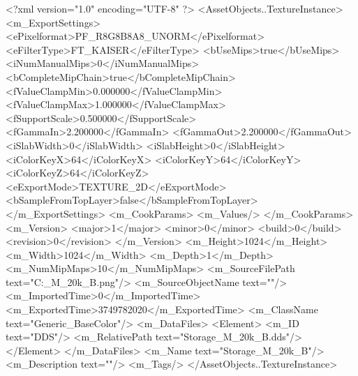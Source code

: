 <?xml version="1.0" encoding="UTF-8" ?>
<AssetObjects..TextureInstance>
	<m_ExportSettings>
		<ePixelformat>PF_R8G8B8A8_UNORM</ePixelformat>
		<eFilterType>FT_KAISER</eFilterType>
		<bUseMips>true</bUseMips>
		<iNumManualMips>0</iNumManualMips>
		<bCompleteMipChain>true</bCompleteMipChain>
		<fValueClampMin>0.000000</fValueClampMin>
		<fValueClampMax>1.000000</fValueClampMax>
		<fSupportScale>0.500000</fSupportScale>
		<fGammaIn>2.200000</fGammaIn>
		<fGammaOut>2.200000</fGammaOut>
		<iSlabWidth>0</iSlabWidth>
		<iSlabHeight>0</iSlabHeight>
		<iColorKeyX>64</iColorKeyX>
		<iColorKeyY>64</iColorKeyY>
		<iColorKeyZ>64</iColorKeyZ>
		<eExportMode>TEXTURE_2D</eExportMode>
		<bSampleFromTopLayer>false</bSampleFromTopLayer>
	</m_ExportSettings>
	<m_CookParams>
		<m_Values/>
	</m_CookParams>
	<m_Version>
		<major>1</major>
		<minor>0</minor>
		<build>0</build>
		<revision>0</revision>
	</m_Version>
	<m_Height>1024</m_Height>
	<m_Width>1024</m_Width>
	<m_Depth>1</m_Depth>
	<m_NumMipMaps>10</m_NumMipMaps>
	<m_SourceFilePath text="C:\Users\Shadow\Desktop\Prototypes\Storage_M_20k_B.png"/>
	<m_SourceObjectName text=""/>
	<m_ImportedTime>0</m_ImportedTime>
	<m_ExportedTime>3749782020</m_ExportedTime>
	<m_ClassName text="Generic_BaseColor"/>
	<m_DataFiles>
		<Element>
			<m_ID text="DDS"/>
			<m_RelativePath text="Storage_M_20k_B.dds"/>
		</Element>
	</m_DataFiles>
	<m_Name text="Storage_M_20k_B"/>
	<m_Description text=""/>
	<m_Tags/>
</AssetObjects..TextureInstance>

